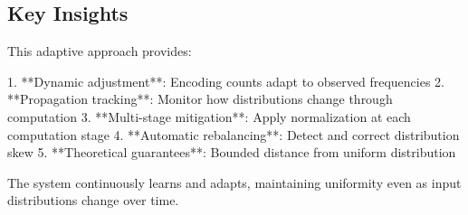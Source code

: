 \subsection{Key Insights}

This adaptive approach provides:

1. **Dynamic adjustment**: Encoding counts adapt to observed frequencies
2. **Propagation tracking**: Monitor how distributions change through computation
3. **Multi-stage mitigation**: Apply normalization at each computation stage
4. **Automatic rebalancing**: Detect and correct distribution skew
5. **Theoretical guarantees**: Bounded distance from uniform distribution

The system continuously learns and adapts, maintaining uniformity even as input distributions change over time.